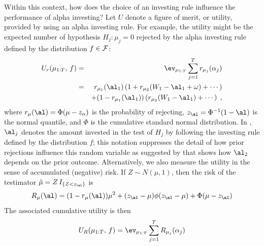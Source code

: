 \documentclass[12pt]{article}
\begin{document}
 Within this context, how does the choice of an investing rule influence the
 performance of alpha investing?  Let $U$ denote a figure of merit, or utility,
 provided by using an alpha investing rule.  For example, the utility might be
 the expected number of hypothesis $H_j:\mu_j=0$ rejected by the alpha investing
 rule defined by the distribution $f \in {\cal F}$:
 \begin{eqnarray}
    U_r(\mu_{1:T},\,f) 
      &=& \ev_{\mu_{1:T}} \sum_{j=1}^T r_{\mu_j}(\alpha_j) \label{eq:Ur} \\
      &=& r_{\mu_1}(\al_1) \left( 1 + r_{\mu_2}(W_1-\al_1+\omega) + \cdots \right)\cr
      & &  + (1-r_{\mu_1}(\al_1))\left( r_{\mu_2}(W_1-\al_1) + \cdots \right) \;,
 \label{eq:Ure}
 \end{eqnarray}
 where $r_\mu(\al) = \Phi(\mu - z_\alpha)$ is the probability of rejecting,
 $z_\al = \Phi^{-1}(1-\al)$ is the normal quantile, and $\Phi$ is the cumulative
 standard normal distribution.  In , $\al_j$ denotes the amount
 invested in the test of $H_j$ by following the investing rule defined by the
 distribution $f$; this notation suppresses the detail of how prior rejections
 influence this random variable as suggested by  that shows how
 $\al_2$ depends on the prior outcome.  Alternatively, we also measure the
 utility in the sense of accumulated (negative) risk.  If $Z \sim N(\mu,1)$,
 then the risk of the testimator $\hat\mu = Z \,I_{\{Z < z_\al\}}$ is
 \begin{equation}
   R_{\mu}(\al) = (1-r_\mu(\al))\mu^2 + (z_\al-\mu)\phi(z_\al-\mu) + \Phi(\mu-z_\al)
 \label{eq:Rmu}
 \end{equation}
 The associated cumulative utility is then
 \begin{equation}
    U_R(\mu_{1:T},\,f) = \ev_{\mu_{1:T}} \sum_{j=1}^T R_{\mu_j}(\alpha_j) 
 \label{eq:UR}
 \end{equation}
 
\end{document}
